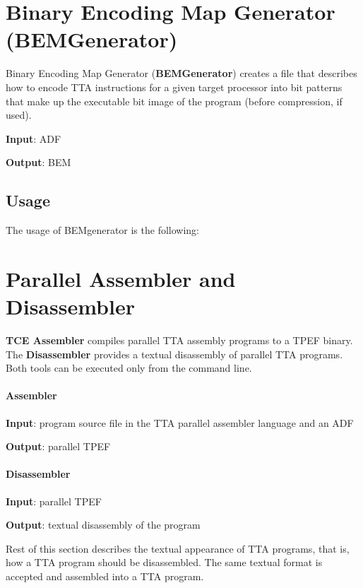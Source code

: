 \documentclass[twoside]{tceusermanual}
\begin{document}
\section{Binary Encoding Map Generator (BEMGenerator)}
\label{section:bemgen}
Binary Encoding Map Generator (\textbf{BEMGenerator}) creates a file that
describes how to encode TTA instructions for a given target processor into
bit patterns that make up the executable bit image of the program (before
compression, if used).

\textbf{Input}: ADF

\textbf{Output}: BEM

\subsection{Usage}

The usage of BEMgenerator is the following:


\section{Parallel Assembler and Disassembler}
\label{section:TCEAsm}

\textbf{TCE Assembler} compiles parallel TTA assembly programs to a TPEF
binary. The \textbf{Disassembler} provides a textual disassembly of
parallel TTA programs. Both tools can be executed only from the command
line.

\paragraph{Assembler}

\textbf{Input}: program source file in the TTA parallel assembler language
and an ADF

\textbf{Output}: parallel TPEF

\paragraph{Disassembler}

\textbf{Input}: parallel TPEF

\textbf{Output}: textual disassembly of the program

Rest of this section describes the textual appearance of TTA programs, that
is, how a TTA program should be disassembled.  The same textual format is
accepted and assembled into a TTA program.
\end{document}
